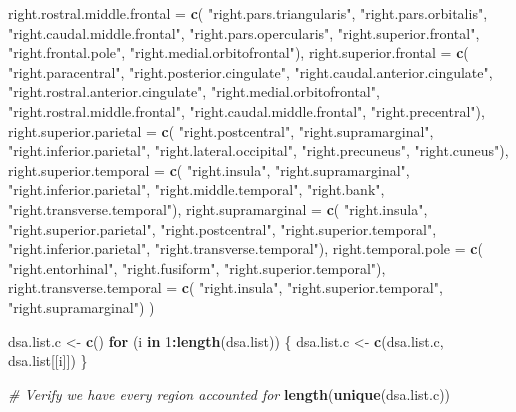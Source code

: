 \documentclass[
]{article}
\newenvironment{Shaded}{\begin{snugshade}}{\end{snugshade}}
\newcommand{\CommentTok}[1]{\textcolor[rgb]{0.56,0.35,0.01}{\textit{#1}}}
\newcommand{\ControlFlowTok}[1]{\textcolor[rgb]{0.13,0.29,0.53}{\textbf{#1}}}
\newcommand{\DataTypeTok}[1]{\textcolor[rgb]{0.13,0.29,0.53}{#1}}
\newcommand{\DecValTok}[1]{\textcolor[rgb]{0.00,0.00,0.81}{#1}}
\newcommand{\KeywordTok}[1]{\textcolor[rgb]{0.13,0.29,0.53}{\textbf{#1}}}
\newcommand{\NormalTok}[1]{#1}
\newcommand{\OperatorTok}[1]{\textcolor[rgb]{0.81,0.36,0.00}{\textbf{#1}}}
\newcommand{\StringTok}[1]{\textcolor[rgb]{0.31,0.60,0.02}{#1}}
\begin{document}
\begin{Shaded}
\begin{Highlighting}[]
 \DataTypeTok{right.rostral.middle.frontal =} \KeywordTok{c}\NormalTok{(}
   \StringTok{"right.pars.triangularis"}\NormalTok{, }\StringTok{"right.pars.orbitalis"}\NormalTok{, }\StringTok{"right.caudal.middle.frontal"}\NormalTok{,}
    \StringTok{"right.pars.opercularis"}\NormalTok{, }\StringTok{"right.superior.frontal"}\NormalTok{,  }\StringTok{"right.frontal.pole"}\NormalTok{,}
    \StringTok{"right.medial.orbitofrontal"}\NormalTok{),}
 \DataTypeTok{right.superior.frontal =} \KeywordTok{c}\NormalTok{(}
   \StringTok{"right.paracentral"}\NormalTok{, }\StringTok{"right.posterior.cingulate"}\NormalTok{, }\StringTok{"right.caudal.anterior.cingulate"}\NormalTok{,}
   \StringTok{"right.rostral.anterior.cingulate"}\NormalTok{,  }\StringTok{"right.medial.orbitofrontal"}\NormalTok{,}
   \StringTok{"right.rostral.middle.frontal"}\NormalTok{, }\StringTok{"right.caudal.middle.frontal"}\NormalTok{, }\StringTok{"right.precentral"}\NormalTok{),}
 \DataTypeTok{right.superior.parietal =} \KeywordTok{c}\NormalTok{(}
   \StringTok{"right.postcentral"}\NormalTok{, }\StringTok{"right.supramarginal"}\NormalTok{, }\StringTok{"right.inferior.parietal"}\NormalTok{,}
   \StringTok{"right.lateral.occipital"}\NormalTok{, }\StringTok{"right.precuneus"}\NormalTok{, }\StringTok{"right.cuneus"}\NormalTok{),}
 \DataTypeTok{right.superior.temporal =} \KeywordTok{c}\NormalTok{(}
   \StringTok{"right.insula"}\NormalTok{, }\StringTok{"right.supramarginal"}\NormalTok{, }\StringTok{"right.inferior.parietal"}\NormalTok{,}
   \StringTok{"right.middle.temporal"}\NormalTok{, }\StringTok{"right.bank"}\NormalTok{, }\StringTok{"right.transverse.temporal"}\NormalTok{),}
 \DataTypeTok{right.supramarginal =} \KeywordTok{c}\NormalTok{(}
   \StringTok{"right.insula"}\NormalTok{, }\StringTok{"right.superior.parietal"}\NormalTok{, }\StringTok{"right.postcentral"}\NormalTok{, }\StringTok{"right.superior.temporal"}\NormalTok{,}
   \StringTok{"right.inferior.parietal"}\NormalTok{, }\StringTok{"right.transverse.temporal"}\NormalTok{),}
 \DataTypeTok{right.temporal.pole =} \KeywordTok{c}\NormalTok{(}
   \StringTok{"right.entorhinal"}\NormalTok{, }\StringTok{"right.fusiform"}\NormalTok{, }\StringTok{"right.superior.temporal"}\NormalTok{),}
 \DataTypeTok{right.transverse.temporal =} \KeywordTok{c}\NormalTok{(}
   \StringTok{"right.insula"}\NormalTok{, }\StringTok{"right.superior.temporal"}\NormalTok{, }\StringTok{"right.supramarginal"}\NormalTok{)}
\NormalTok{ )}

\NormalTok{dsa.list.c <-}\StringTok{ }\KeywordTok{c}\NormalTok{()}
\ControlFlowTok{for}\NormalTok{ (i }\ControlFlowTok{in} \DecValTok{1}\OperatorTok{:}\KeywordTok{length}\NormalTok{(dsa.list)) \{}
\NormalTok{  dsa.list.c <-}\StringTok{ }\KeywordTok{c}\NormalTok{(dsa.list.c, dsa.list[[i]])}
\NormalTok{\}}

\CommentTok{# Verify we have every region accounted for}
\KeywordTok{length}\NormalTok{(}\KeywordTok{unique}\NormalTok{(dsa.list.c))}
\end{Highlighting}
\end{Shaded}
\end{document}
